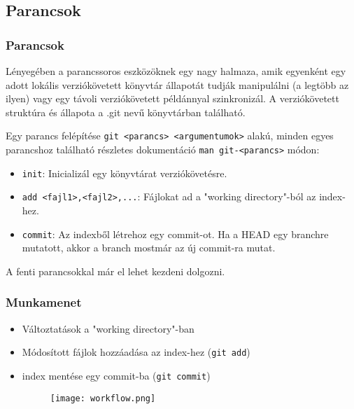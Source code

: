 	\subsection{Parancsok}
	\begin{frame}
	  \frametitle{Parancsok}
	  Lényegében a \git parancssoros eszközöknek egy nagy halmaza, amik egyenként egy adott lokális verziókövetett könyvtár állapotát tudják manipulálni (a legtöbb az ilyen) vagy egy távoli verziókövetett példánnyal szinkronizál. A verziókövetett struktúra és állapota a .git nevű könyvtárban található.

	  Egy \git parancs felépítése \lstinline|git <parancs> <argumentumok>| alakú, minden egyes parancshoz található részletes dokumentáció \lstinline|man git-<parancs>| módon:
	  \begin{itemize}
	    \item \lstinline|init|: Inicializál egy könyvtárat verziókövetésre.
	    \item \lstinline|add <fajl1>,<fajl2>,...|: Fájlokat ad a "working directory"-ból az index-hez.
	    \item \lstinline|commit|: Az indexből létrehoz egy commit-ot. Ha a HEAD egy branchre mutatott, akkor a branch mostmár az új commit-ra mutat.
	  \end{itemize}
	  A fenti parancsokkal már el lehet kezdeni dolgozni.
	\end{frame}

	\begin{frame}
	  \frametitle{Munkamenet}
	  \begin{itemize}
	    \item{Változtatások a "working directory"-ban}
	    \item{Módosított fájlok hozzáadása az index-hez (\lstinline+git add+)}
	    \item{index mentése egy commit-ba (\lstinline+git commit+)}
	      \begin{figure}
		\centering
		\texttt{[image: workflow.png]}
	      \end{figure}
	  \end{itemize}
	\end{frame}

